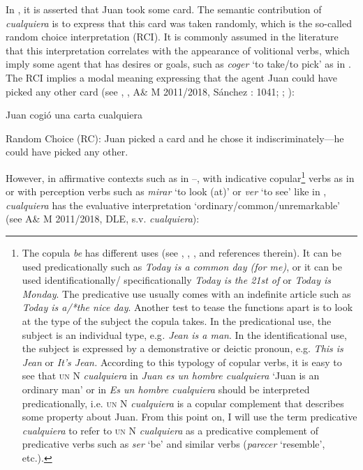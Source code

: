 \documentclass[output=paper]{langscibook}
\begin{document}
  In , it is asserted that Juan took some card. The semantic contribution of \textit{cualquiera} is to express that this card was taken randomly, which is the so-called random choice interpretation (RCI). It is commonly assumed in the literature that this interpretation correlates with the appearance of volitional verbs, which imply some agent that has desires or goals, such as \textit{coger} ‘to take/to pick’ as in . The RCI implies a modal meaning expressing that the agent Juan could have picked any other card (see \citealt{Menéndez-Benito2005}, \citealt{ChoiRomero2008}, A\& M 2011/2018, Sánchez \citealt{López1999}: 1041; \citealt{Arregui2006}; \citealt{Rivero2011}):

\label{bkm:Ref533761157}  Juan cogió una carta cualquiera

  Random Choice (RC): Juan picked a card and he chose it indiscriminately—he could have picked any other.

  \citep[2]{Menéndez-Benito2005}

However, in affirmative contexts such as in –, with indicative copular\footnote{ \textrm{The copula} \textrm{\textit{be}} \textrm{has different uses (see \citealt{Higgins1979}, \citealt{Zamparelli2000}, \citealt{Author2015}, and references therein). It can be used predicationally such as} \textrm{\textit{Today is a common day (for me)}}\textrm{, or it can be used identificationally/ specificationally} \textrm{\textit{Today is the 21st of \citealt{July2010}} }\textrm{or}\textrm{ \textit{Today is Monday}}\textrm{. The predicative use usually comes with an indefinite article such as} \textrm{\textit{Today is a/*the nice day}}\textrm{. Another test to tease the functions apart is to look at the type of the subject the copula takes. In the predicational use, the subject is an individual type, e.g}\textrm{\textit{. Jean is a man}}\textrm{. In the identificational use, the subject is expressed by a demonstrative or deictic pronoun, e.g.} \textrm{\textit{This is Jean} }\textrm{or}\textrm{ \textit{It’s Jean.}} \textrm{According to this typology of copular verbs, it is easy to see that} \textsc{un} \textrm{N}\textrm{ \textit{cualquiera}} \textrm{in} \textrm{\textit{Juan es un hombre cualquiera}} \textrm{‘Juan is an ordinary man’ or in} \textrm{\textit{Es un hombre cualquiera}} \textrm{should be interpreted predicationally, i.e.} \textsc{un} \textrm{N}\textrm{ \textit{cualquiera}} \textrm{is a copular complement that describes some property about Juan. From this point on, I will use the term predicative} \textrm{\textit{cualquiera}} \textrm{to refer to} \textsc{un} \textrm{N} \textrm{\textit{cualquiera}} \textrm{as a predicative complement of predicative verbs such as} \textrm{\textit{ser}} \textrm{‘be’ and similar verbs (}\textrm{\textit{parecer}} \textrm{‘resemble’, etc.).} } verbs as in  or with perception verbs such as \textit{mirar} ‘to look (at)’ or \textit{ver} ‘to see’ like in , \textit{cualquiera} has the evaluative interpretation ‘ordinary/common/unremarkable’ (see A\& M 2011/2018, DLE, s.v. \textit{cualquiera}):
\end{document}
